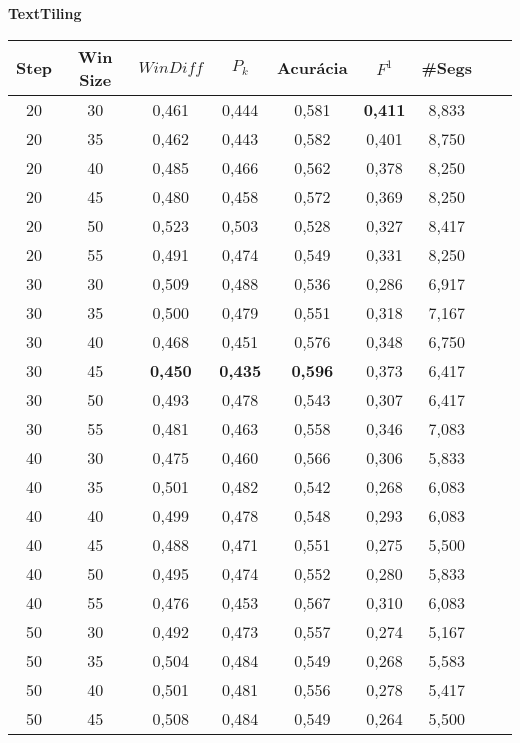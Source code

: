 \documentclass{article}
\begin{document}
{  
\large
\center
	\textbf{TextTiling}  

}


\begin{longtable}[c]{|c|c|c|c|c|c|c|c|c|} 
\hline 
 Step & Win Size & $WinDiff$ & $P_k$ & Acurácia & $F^1$ & \#Segs\\ \hline 
 20 & 30 & 0,461 & 0,444 & 0,581 & \cellcolor{gray!20} \textbf{0,411} & 8,833  \\ \hline 
 20 & 35 & 0,462 & 0,443 & 0,582 & 0,401 & 8,750  \\ \hline 
 20 & 40 & 0,485 & 0,466 & 0,562 & 0,378 & 8,250  \\ \hline 
 20 & 45 & 0,480 & 0,458 & 0,572 & 0,369 & 8,250  \\ \hline 
 20 & 50 & 0,523 & 0,503 & 0,528 & 0,327 & 8,417  \\ \hline 
 20 & 55 & 0,491 & 0,474 & 0,549 & 0,331 & 8,250  \\ \hline 
 30 & 30 & 0,509 & 0,488 & 0,536 & 0,286 & 6,917  \\ \hline 
 30 & 35 & 0,500 & 0,479 & 0,551 & 0,318 & 7,167  \\ \hline 
 30 & 40 & 0,468 & 0,451 & 0,576 & 0,348 & 6,750  \\ \hline 
 30 & 45 & \cellcolor{gray!20} \textbf{0,450} & \cellcolor{gray!20} \textbf{0,435} & \cellcolor{gray!20} \textbf{0,596} & 0,373 & 6,417  \\ \hline 
 30 & 50 & 0,493 & 0,478 & 0,543 & 0,307 & 6,417  \\ \hline 
 30 & 55 & 0,481 & 0,463 & 0,558 & 0,346 & 7,083  \\ \hline 
 40 & 30 & 0,475 & 0,460 & 0,566 & 0,306 & 5,833  \\ \hline 
 40 & 35 & 0,501 & 0,482 & 0,542 & 0,268 & 6,083  \\ \hline 
 40 & 40 & 0,499 & 0,478 & 0,548 & 0,293 & 6,083  \\ \hline 
 40 & 45 & 0,488 & 0,471 & 0,551 & 0,275 & 5,500  \\ \hline 
 40 & 50 & 0,495 & 0,474 & 0,552 & 0,280 & 5,833  \\ \hline 
 40 & 55 & 0,476 & 0,453 & 0,567 & 0,310 & 6,083  \\ \hline 
 50 & 30 & 0,492 & 0,473 & 0,557 & 0,274 & 5,167  \\ \hline 
 50 & 35 & 0,504 & 0,484 & 0,549 & 0,268 & 5,583  \\ \hline 
 50 & 40 & 0,501 & 0,481 & 0,556 & 0,278 & 5,417  \\ \hline 
 50 & 45 & 0,508 & 0,484 & 0,549 & 0,264 & 5,500  \\ \hline 

\end{longtable}
\end{document}
